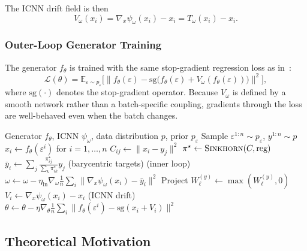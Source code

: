 \documentclass[10pt,conference,compsocconf]{IEEEtran}
\newcommand{\E}{\mathbb{E}}
\begin{document}
The ICNN drift field is then
\begin{equation}\label{eq:V_icnn}
  V_\omega(x_i) = \nabla_x \psi_\omega(x_i) - x_i = T_\omega(x_i) - x_i.
\end{equation}

\subsubsection{Outer-Loop Generator Training}

The generator $f_\theta$ is trained with the same stop-gradient regression loss as in~\cite{deng2026drifting}:
\begin{equation}\label{eq:outer_loss}
  \mathcal{L}(\theta) = \E_{\varepsilon \sim p_\varepsilon}\bigl[\bigl\|f_\theta(\varepsilon) - \mathrm{sg}\bigl(f_\theta(\varepsilon) + V_\omega(f_\theta(\varepsilon))\bigr)\bigr\|^2\bigr],
\end{equation}
where $\mathrm{sg}(\cdot)$ denotes the stop-gradient operator.
Because $V_\omega$ is defined by a smooth network rather than a batch-specific coupling, gradients through the loss are well-behaved even when the batch changes.

\begin{algorithm}[t]
\caption{ICNN-Drifting Training Step}
\label{alg:icnn_drift}
\begin{algorithmic}[1]
\Require Generator $f_\theta$, ICNN $\psi_\omega$, data distribution $p$, prior $p_\varepsilon$
\State Sample $\varepsilon^{1:n} \sim p_\varepsilon$, \; $y^{1:n} \sim p$
\State $x_i \leftarrow f_\theta(\varepsilon^i)$ for $i = 1,\ldots,n$
\State $C_{ij} \leftarrow \|x_i - y_j\|^2$
\State $\pi^\star \leftarrow \textsc{Sinkhorn}(C, \text{reg})$
\State $\bar{y}_i \leftarrow \sum_j \frac{\pi^\star_{ij}}{\sum_k \pi^\star_{ik}} y_j$ \hfill (barycentric targets)
 \hfill (inner loop)
  \State $\omega \leftarrow \omega - \eta_{\text{in}} \nabla_\omega \frac{1}{n}\sum_i \|\nabla_x \psi_\omega(x_i) - \bar{y}_i\|^2$
  \State Project $W^{(y)}_\ell \leftarrow \max(W^{(y)}_\ell, 0)$
\EndFor
\State $V_i \leftarrow \nabla_x \psi_\omega(x_i) - x_i$ \hfill (ICNN drift)
\State $\theta \leftarrow \theta - \eta \nabla_\theta \frac{1}{n}\sum_i \|f_\theta(\varepsilon^i) - \mathrm{sg}(x_i + V_i)\|^2$
\end{algorithmic}
\end{algorithm}

\subsection{Theoretical Motivation}
\end{document}

